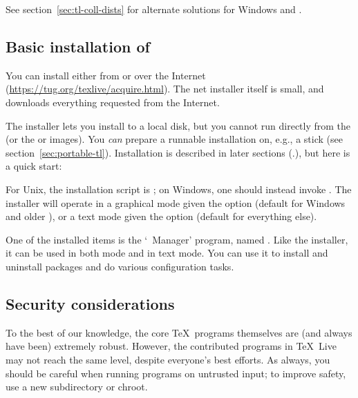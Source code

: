 \documentclass{article}
\begin{document}
See section~\ref{sec:tl-coll-dists} for alternate solutions
for Windows and \MacOSX.

\subsection{Basic installation of \protect\TL{}}
\label{sec:basic}

You can install \TL{} either from \DVD{} or over the Internet
(\url{https://tug.org/texlive/acquire.html}). The net installer itself is
small, and downloads everything requested from the Internet.

The \DVD{} installer lets you install to a local disk, but you cannot
run \TL{} directly from the \TK{} \DVD{} (or the \TK{} or \TL{}
 images). You \emph{can} prepare a runnable installation on,
e.g., a \USB{} stick (see section~\ref{sec:portable-tl}). Installation
is described in later sections (\p.\pageref{sec:install}), but here is a
quick start:

\begin{itemize*}

\item For Unix, the installation script is ; on
  Windows, one should instead invoke .
  The installer will operate in a graphical mode given the option
   (default for Windows and older \MacOSX), or a text mode given
  the option  (default for everything else).

\item One of the installed items is the `\TL\ Manager' program,
  named .  Like the installer, it can be used in both \GUI{}
  mode and in text mode. You can use it to install and uninstall
  packages and do various configuration tasks.

\end{itemize*}


\subsection{Security considerations}
\label{sec:security}

To the best of our knowledge, the core \TeX\ programs themselves are
(and always have been) extremely robust.  However, the contributed
programs in \TeX\ Live may not reach the same level, despite everyone's
best efforts.  As always, you should be careful when running programs on
untrusted input; to improve safety, use a new subdirectory or chroot.
\end{document}
